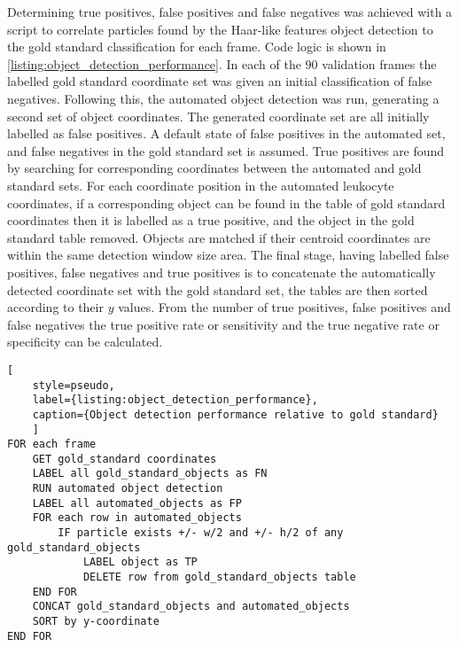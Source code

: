 Determining true positives, false positives and false negatives was achieved with a script to correlate particles found by the Haar-like features object detection to the gold standard classification for each frame. Code logic is shown in \autoref{listing:object_detection_performance}. In each of the 90 validation frames the labelled gold standard coordinate set was given an initial classification of false negatives. Following this, the automated object detection was run, generating a second set of object coordinates. The generated coordinate set are all initially labelled as false positives. A default state of false positives in the automated set, and false negatives in the gold standard set is assumed. True positives are found by searching for corresponding coordinates between the automated and gold standard sets. For each coordinate position in the automated leukocyte coordinates, if a corresponding object can be found in the table of gold standard coordinates then it is labelled as a true positive, and the object in the gold standard table removed. Objects are matched if their centroid coordinates are within the same detection window size area. The final stage, having labelled false positives, false negatives and true positives is to concatenate the automatically detected coordinate set with the gold standard set, the tables are then sorted according to their $y$ values. From the number of true positives, false positives and false negatives the true positive rate or sensitivity and the true negative rate or specificity can be calculated.

\begin{lstlisting}[
	style=pseudo,
	label={listing:object_detection_performance},
	caption={Object detection performance relative to gold standard}
	]
FOR each frame
	GET gold_standard coordinates
	LABEL all gold_standard_objects as FN
	RUN automated object detection
	LABEL all automated_objects as FP
	FOR each row in automated_objects
		IF particle exists +/- w/2 and +/- h/2 of any gold_standard_objects
			LABEL object as TP
			DELETE row from gold_standard_objects table
	END FOR
	CONCAT gold_standard_objects and automated_objects
	SORT by y-coordinate
END FOR
\end{lstlisting}

